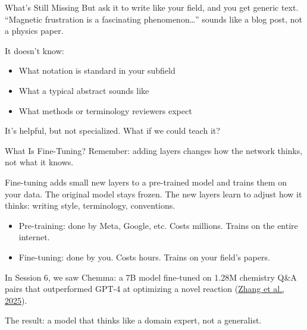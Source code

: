 \documentclass[aspectratio=169]{beamer}
\begin{document}
\begin{frame}{What's Still Missing}
    But ask it to write like your field, and you get generic text. ``Magnetic frustration is a fascinating phenomenon\ldots'' sounds like a blog post, not a physics paper.

    \vspace{0.8em}
    It doesn't know:
    \begin{itemize}
        \vspace{0.3em}
        \item What notation is standard in your subfield
        \vspace{0.3em}
        \item What a typical abstract sounds like
        \vspace{0.3em}
        \item What methods or terminology reviewers expect
    \end{itemize}

    \vspace{1em}
    It's helpful, but not specialized. What if we could teach it?
\end{frame}


\begin{frame}{What Is Fine-Tuning?}
    Remember: adding layers changes how the network thinks, not what it knows.

    \vspace{0.5em}
    Fine-tuning adds small new layers to a pre-trained model and trains them on your data. The original model stays frozen. The new layers learn to adjust how it thinks: writing style, terminology, conventions.

    \begin{itemize}
        \vspace{0.3em}
        \item Pre-training: done by Meta, Google, etc. Costs millions. Trains on the entire internet.
        \vspace{0.3em}
        \item Fine-tuning: done by you. Costs hours. Trains on your field's papers.
    \end{itemize}

    \vspace{0.5em}
    In Session 6, we saw Chemma: a 7B model fine-tuned on 1.28M chemistry Q\&A pairs that outperformed GPT-4 at optimizing a novel reaction (\href{https://arxiv.org/abs/2504.18340}{Zhang et al., 2025}).

    \vspace{0.5em}
    The result: a model that thinks like a domain expert, not a generalist.
\end{frame}
\end{document}
